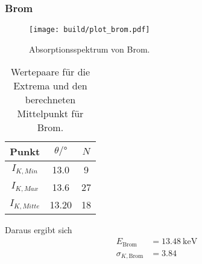 \clearpage
\subsubsection*{Brom}
\begin{figure}[H]
    \centering
    \texttt{[image: build/plot\_brom.pdf]}
    \caption{Absorptionsspektrum von Brom.}
    \label{fig:brom}
\end{figure}
\begin{table}[H]                                                                                   
    \centering                                                                                     
        \caption{Wertepaare für die Extrema und den berechneten Mittelpunkt für Brom.}                      
        \label{tab:Br}                                                                        
        \begin{tabular}{S S[table-format=2.2] S}                                                   
          \toprule                                                                                 
          {Punkt} & {$\theta /\si{\degree}$} & {$N$}\\                                            
          \midrule                                                                                 
          {$I_{K,Min  }$} &13.0&9\\
          {$I_{K,Max  }$} &13.6&27\\
          {$I_{K,Mitte}$} &13.20&18\\
          \bottomrule                                                                              
        \end{tabular}                                                                              
      \end{table}                                                                                  
Daraus ergibt sich                                                                                 
\begin{align*}                                                                                     
    E_\text{Brom} &= \SI{13.48}{\kilo\electronvolt}\\                  
    \sigma_{K, \text{Brom}} &= \num{3.84}                      
\end{align*}                                                                                       

